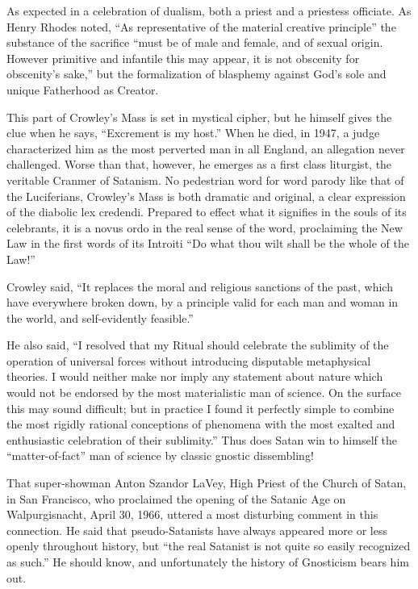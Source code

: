 As expected in a celebration of dualism, both a priest and a priestess officiate. As Henry Rhodes noted, ``As representative of the material creative principle'' the substance of the sacrifice ``must be of male and female, and of sexual origin. However primitive and infantile this may appear, it is not obscenity for obscenity's sake,'' but the formalization of blasphemy against God's sole and unique Fatherhood as Creator.

This part of Crowley's Mass is set in mystical cipher, but he himself gives the clue when he says, ``Excrement is my host.'' When he died, in 1947, a judge characterized him as the most perverted man in all England, an allegation never challenged. Worse than that, however, he emerges as a first class liturgist, the veritable Cranmer of Satanism. No pedestrian word for word parody like that of the Luciferians, Crowley's Mass is both dramatic and original, a clear expression of the diabolic lex credendi. Prepared to effect what it signifies in the souls of its celebrants, it is a novus ordo in the real sense of the word, proclaiming the New Law in the first words of its Introiti ``Do what thou wilt shall be the whole of the Law!''

Crowley said, ``It replaces the moral and religious sanctions of the past, which have everywhere broken down, by a principle valid for each man and woman in the world, and self-evidently feasible.''

He also said, ``I resolved that my Ritual should celebrate the sublimity of the operation of universal forces without introducing disputable metaphysical theories. I would neither make nor imply any statement about nature which would not be endorsed by the most materialistic man of science. On the surface this may sound difficult; but in practice I found it perfectly simple to combine the most rigidly rational conceptions of phenomena with the most exalted and enthusiastic celebration of their sublimity.'' Thus does Satan win to himself the ``matter-of-fact'' man of science by classic gnostic dissembling!

That super-showman Anton Szandor LaVey, High Priest of the Church of Satan, in San Francisco, who proclaimed the opening of the Satanic Age on Walpurgisnacht, April 30, 1966, uttered a most disturbing comment in this connection. He said that pseudo-Satanists have always appeared more or less openly throughout history, but ``the real Satanist is not quite so easily recognized as such.'' He should know, and unfortunately the history of Gnosticism bears him out.

